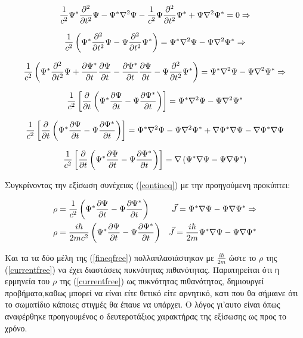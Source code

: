 \[
 \frac{1}{c^2}\Psi^* \frac{\partial ^2}{\partial t^2} \Psi - \Psi^* \nabla^2\Psi  - \frac{1}{c^2} \Psi \frac{\partial ^2}{\partial t^2}\Psi^* + \Psi \nabla^2 \Psi^* = 0 \Rightarrow
\]

\[
 \frac{1}{c^2} \left(  \Psi^* \frac{\partial ^2}{\partial t^2} \Psi - \Psi \frac{\partial ^2}{\partial t^2}\Psi^* \right)  = \Psi^* \nabla^2\Psi- \Psi \nabla^2 \Psi^*  \Rightarrow
\]

\[ 
\frac{1}{c^2} \left(  \Psi^* \frac{\partial ^2}{\partial t^2} \Psi + \frac{\partial \Psi^*}{\partial t} \frac{\partial \Psi}{\partial t}-\frac{\partial \Psi^*}{\partial t} \frac{\partial \Psi}{\partial t}- \Psi \frac{\partial ^2}{\partial t^2}\Psi^* \right)  = \Psi^* \nabla^2\Psi- \Psi \nabla^2 \Psi^*  \Rightarrow
\]

\[
 \frac{1}{c^2} \left[  \frac{\partial }{\partial t} \left(  \Psi^* \frac{\partial \Psi}{\partial t} - \Psi\frac{\partial \Psi^*}{\partial t} \right)  \right]  = \Psi^* \nabla^2\Psi- \Psi \nabla^2 \Psi^*  
\]

\[
\frac{1}{c^2} \left[  \frac{\partial }{\partial t} \left(  \Psi^* \frac{\partial \Psi}{\partial t} - \Psi\frac{\partial \Psi^*}{\partial t} \right)  \right]  = \Psi^* \nabla^2\Psi- \Psi \nabla^2 \Psi^*+\nabla \Psi^* \nabla \Psi-  \nabla \Psi^* \nabla \Psi  
\]

\begin{equation}
 \frac{1}{c^2} \left[  \frac{\partial }{\partial t} \left(  \Psi^* \frac{\partial \Psi}{\partial t} - \Psi\frac{\partial \Psi^*}{\partial t} \right)  \right]  = \nabla \left(  \Psi^* \nabla \Psi- \Psi \nabla \Psi^* \right)   
 \label{fineqfree}
\end{equation}

Συγκρίνοντας την εξίσωση συνέχειας (\ref{contineq}) με την προηγούμενη προκύπτει: 

\begin{align}
  \notag \rho &= \frac{1}{c^2} \left(  \Psi^* \frac{\partial \Psi}{\partial t} - \Psi\frac{\partial \Psi^*}{\partial t} \right)    &\vec{J}= \Psi^* \nabla \Psi- \Psi \nabla \Psi^*   \Rightarrow
  \\  \rho &= \frac{i\hbar}{2mc^2} \left(  \Psi^* \frac{\partial \Psi}{\partial t} - \Psi\frac{\partial \Psi^*}{\partial t} \right)    &\vec{J}= \frac{i\hbar}{2m}\Psi^* \nabla \Psi- \Psi \nabla \Psi^*   
  \label{currentfree}
\end{align}

\vspace{0.5cm}

 Kαι τα τα δύο μέλη της (\ref{fineqfree}) πολλαπλασιάστηκαν με $\frac{i \hbar}{2m}$ ώστε το $\rho$ της (\ref{currentfree}) να έχει διαστάσεις πυκνότητας πιθανότητας.
Παρατηρείται ότι η ερμηνεία του $\rho$ της (\ref{currentfree}) ως πυκνότητας πιθανότητας, δημιουργεί προβήματα,καθως μπορεί να είναι είτε θετικό είτε αρνητικό, κατι που θα σήμαινε ότι το σωματίδιο κάποιες στιγμές θα έπαυε να υπάρχει. Ο λόγος γι'αυτο είναι όπως αναφέρθηκε προηγουμένος ο δευτεροτάξιος χαρακτήρας της εξίσωσης ως προς το χρόνο. 
